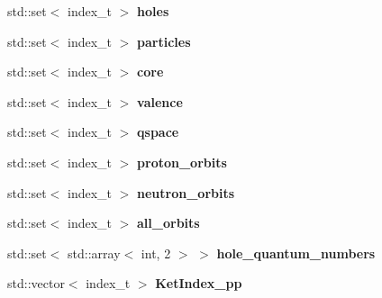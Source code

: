 \begin{DoxyCompactItemize}
\item 
\hypertarget{classModelSpace_a276761e6150cb7c54da56f4f5aa8dd4c}{std\-::set$<$ index\-\_\-t $>$ {\bfseries holes}}\label{classModelSpace_a276761e6150cb7c54da56f4f5aa8dd4c}

\item 
\hypertarget{classModelSpace_a0db189a05ef3be800c638b922960d759}{std\-::set$<$ index\-\_\-t $>$ {\bfseries particles}}\label{classModelSpace_a0db189a05ef3be800c638b922960d759}

\item 
\hypertarget{classModelSpace_a50c3527104fb209f7f5b1f6d50089507}{std\-::set$<$ index\-\_\-t $>$ {\bfseries core}}\label{classModelSpace_a50c3527104fb209f7f5b1f6d50089507}

\item 
\hypertarget{classModelSpace_a4998bab7ea1526caba10f67ee7079c64}{std\-::set$<$ index\-\_\-t $>$ {\bfseries valence}}\label{classModelSpace_a4998bab7ea1526caba10f67ee7079c64}

\item 
\hypertarget{classModelSpace_a43584d248e955115a789f7fa8e95cbf7}{std\-::set$<$ index\-\_\-t $>$ {\bfseries qspace}}\label{classModelSpace_a43584d248e955115a789f7fa8e95cbf7}

\item 
\hypertarget{classModelSpace_ad04f475fd84a89b4aa8f0671a987b4fc}{std\-::set$<$ index\-\_\-t $>$ {\bfseries proton\-\_\-orbits}}\label{classModelSpace_ad04f475fd84a89b4aa8f0671a987b4fc}

\item 
\hypertarget{classModelSpace_a57ad233fb92923d0277bee43d19d1715}{std\-::set$<$ index\-\_\-t $>$ {\bfseries neutron\-\_\-orbits}}\label{classModelSpace_a57ad233fb92923d0277bee43d19d1715}

\item 
\hypertarget{classModelSpace_afba034efff55bacd185ea07f892eafd8}{std\-::set$<$ index\-\_\-t $>$ {\bfseries all\-\_\-orbits}}\label{classModelSpace_afba034efff55bacd185ea07f892eafd8}

\item 
\hypertarget{classModelSpace_a9f06141edec5bcf007be4d7481a53ec8}{std\-::set$<$ std\-::array$<$ int, 2 $>$ $>$ {\bfseries hole\-\_\-quantum\-\_\-numbers}}\label{classModelSpace_a9f06141edec5bcf007be4d7481a53ec8}

\item 
\hypertarget{classModelSpace_ab267ad148808164c15e202d3a51cf2b4}{std\-::vector$<$ index\-\_\-t $>$ {\bfseries Ket\-Index\-\_\-pp}}\label{classModelSpace_ab267ad148808164c15e202d3a51cf2b4}


\end{DoxyCompactItemize}
